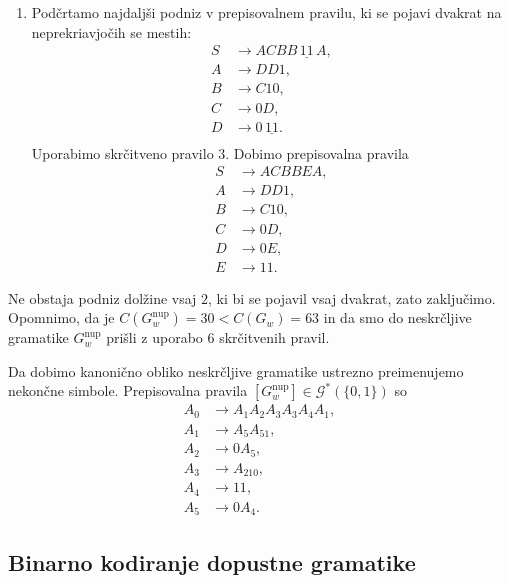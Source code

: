 \documentclass[fin1, tisk]{fmfdelo}
\newcommand{\G}{\mathcal{G}}
\theoremstyle{definition}
\begin{document}
\begin{primer}
\begin{enumerate}
        \item Podčrtamo najdaljši podniz v prepisovalnem pravilu, ki se pojavi
        dvakrat na neprekriavjočih se mestih:
        \begin{align*}
            S &\rightarrow ACBB \, \underline{11} \, A, \\
            A &\rightarrow DD1, \\
            B &\rightarrow C10, \\
            C &\rightarrow 0D, \\
            D &\rightarrow 0 \, \underline{11}. \\
        \end{align*}
        Uporabimo skrčitveno pravilo $3$. Dobimo prepisovalna pravila
        \begin{align*}
            S &\rightarrow ACBBEA, \\
            A &\rightarrow DD1, \\
            B &\rightarrow C10, \\
            C &\rightarrow 0D, \\
            D &\rightarrow 0E, \\
            E &\rightarrow 11.
        \end{align*}
    \end{enumerate}
    Ne obstaja podniz dolžine vsaj $2$, ki bi se pojavil vsaj dvakrat, zato zaključimo.
    Opomnimo, da je $C(G^\text{nup}_w) = 30 < C(G_w) = 63$ in da smo do neskrčljive gramatike
    $G^\text{nup}_w$ prišli z uporabo $6$ skrčitvenih pravil.

    Da dobimo kanonično obliko neskrčljive gramatike ustrezno preimenujemo
    nekončne simbole. Prepisovalna pravila $[G^\text{nup}_w] \in \G^*(\{ 0, 1 \})$ so
    \begin{align*}
        A_0 &\rightarrow A_1A_2A_3A_3A_4A_1, \\
        A_1 &\rightarrow A_5A_51, \\
        A_2 &\rightarrow 0A_5, \\
        A_3 &\rightarrow A_210, \\
        A_4 &\rightarrow 11, \\
        A_5 &\rightarrow 0A_4.
    \end{align*}
\end{primer}

\subsection{Binarno kodiranje dopustne gramatike}
\end{document}
